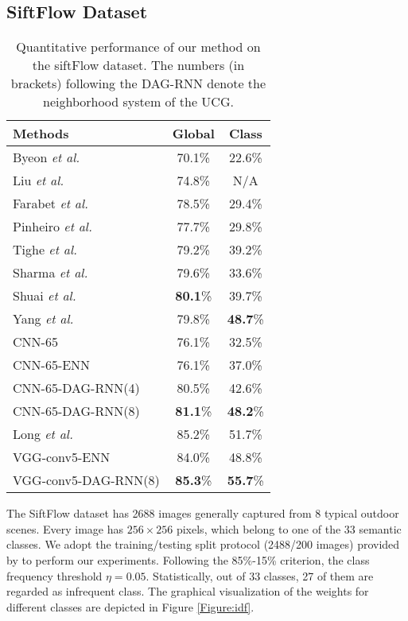 \documentclass[10pt,twocolumn,letterpaper]{article}
\begin{document}
\subsection{SiftFlow Dataset}
\begin{table}[t]
\footnotesize
\begin{center}
\begin{tabular}{|l|cc|}
\hline
Methods & Global & Class \\
\hline
Byeon \emph{et al.} \cite{byeon2015scene} & 70.1\% & 22.6\% \\
Liu \emph{et al.}\cite{liu2009nonparametric} & 74.8\% & N/A \\
Farabet \emph{et al.} \cite{farabet2013learning} & 78.5\% & 29.4\% \\
Pinheiro \emph{et al.} \cite{pinheiro2014recurrent} & 77.7\% & 29.8\% \\
Tighe \emph{et al.}\cite{tighe2013finding} & 79.2\% & 39.2\% \\
Sharma \emph{et al.}\cite{sharma2014recursive} & 79.6\% & 33.6\% \\
Shuai \emph{et al.}\cite{shuai2015integrating} & \textbf{80.1}\% & 39.7\% \\
Yang \emph{et al.}\cite{yang2014context} & 79.8\% & \textbf{48.7}\% \\
\hline
CNN-65 & 76.1\% & 32.5\% \\
CNN-65-ENN & 76.1\% & 37.0\% \\
CNN-65-DAG-RNN(4) & 80.5\% & 42.6\% \\
CNN-65-DAG-RNN(8) & \textbf{81.1}\% & \textbf{48.2}\% \\
\hline
\hline
Long \emph{et al.}\cite{long2015fully} & 85.2\% & 51.7\% \\
\hline
VGG-conv5-ENN & 84.0\% & 48.8\% \\
VGG-conv5-DAG-RNN(8) & \textbf{85.3}\% & \textbf{55.7}\% \\
\hline
\end{tabular}
\end{center}
\caption{Quantitative performance of our method on the siftFlow dataset. The numbers (in brackets) following the DAG-RNN denote the neighborhood system of the UCG.}
\label{Table:result_SiftFlow}
\end{table}

The SiftFlow dataset has 2688 images generally captured from 8 typical outdoor scenes. Every image has $256 \times 256$ pixels, which belong to one of the 33 semantic classes. We adopt the training/testing split protocol (2488/200 images) provided by \cite{liu2009nonparametric} to perform our experiments.  Following the 85\%-15\% criterion, the class frequency threshold $\eta = 0.05$. Statistically, out of 33 classes, 27 of them are regarded as infrequent class. The graphical visualization of the weights for different classes are depicted in Figure \ref{Figure:idf}.
\end{document}
